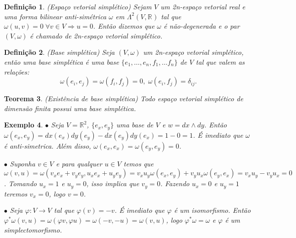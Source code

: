 \documentclass{beamer}
\newtheorem{teorema}{Teorema}[section]
\newtheorem{definicao}[teorema]{Definição}
\newtheorem{exemplo}[teorema]{Exemplo}
\newcommand{\real}[1]{\mathbb{R}^{#1}}
\begin{document}
\begin{frame}
	\begin{definicao}
		(Espaço vetorial simplético) Sejam $V$ um 2n-espaço vetorial real e uma forma bilinear anti-simétrica $\omega$ em $\Lambda^{2}(V, \real{})$ tal que $\omega(u,v) = 0 \; \forall v \in V \Rightarrow u=0$. Então dizemos que $\omega$ é não-degenerada e o par $(V, \omega)$ é chamado de 2n-espaço vetorial simplético.
	\end{definicao}
	\begin{definicao}
		(Base simplética) Seja $(V, \omega)$ um 2n-espaço vetorial simplético, então uma base simplética é uma base $\{ e_{1},\dots, e_{n},f_{1},\dots f_{n}\}$ de $V$ tal que valem as relações:
		$$
		\omega(e_{i}, e_{j}) = \omega(f_{i}, f_{j}) = 0, \; \omega(e_{i}, f_{j}) = \delta_{ij}.
		$$
	\end{definicao}
	\begin{teorema}
		(Existência de base simplética) Todo espaço vetorial simplético de dimensão finita possui uma base simplética.
	\end{teorema}
\end{frame}

\begin{frame}
	
	
	
	\begin{exemplo}
		$\bullet $ Seja $V = \real{2}$, $\{e_{x}, e_{y}\}$ uma base de $V$ e $w=dx \wedge dy$. Então $\omega(e_{x}, e_{y}) =dx(e_{x}) dy(e_{y}) - dx(e_{y}) dy(e_{x}) = 1-0= 1$. É imediato que $\omega$ é anti-simetrica. Além disso, $\omega(e_{x}, e_{x}) = \omega(e_{y}, e_{y}) = 0$. 
		
		$\bullet $ Suponha $v \in V$ e para qualquer $u \in V$ temos que $\omega(v, u) = \omega(v_{x}e_{x}+v_{y}e_{y}, u_{x}e_{x}+u_{y}e_{y}) = v_{x}u_{y}\omega(e_{x}, e_{y}) +v_{y}u_{x}\omega(e_{y}, e_{x}) = v_{x}u_{y} -v_{y}u_{x} = 0$. Tomando $u_{x} = 1$ e $u_{y} = 0$, isso implica que $v_{y} = 0$. Fazendo $u_{x} = 0$ e $u_{y} = 1$ teremos $v_{x} = 0$, logo $v=0$. 
		
		$\bullet $ Seja $\varphi:V \to V$ tal que $\varphi(v) = -v$. É imediato que $\varphi$ é um isomorfismo. Então $\varphi^{*}\omega(v, u) = \omega(\varphi v, \varphi u)=\omega(-v, -u)=\omega(v, u)$, logo $\varphi^{*}\omega = \omega$ e $\varphi$ é um simplectomorfismo.		
	\end{exemplo}
\end{frame}
\end{document}
